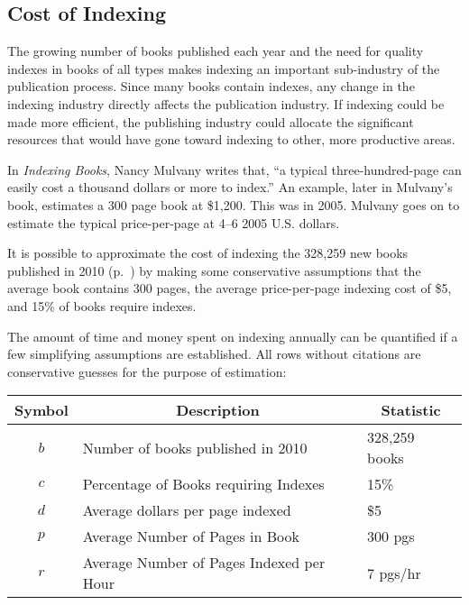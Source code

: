 \subsection{Cost of Indexing}

The growing number of books published each year and the need for quality indexes in books of all types makes indexing an important sub-industry of the publication process.
Since many books contain indexes, any change in the indexing industry directly affects the publication industry.
If indexing could be made more efficient, the publishing industry could allocate the significant resources that would have gone toward indexing to other, more productive areas.

In {\it Indexing Books}, Nancy Mulvany writes that, ``a typical three-hundred-page can easily cost a thousand dollars or more to index.''
An example, later in Mulvany's book, estimates a 300 page book at \$1,200.
This was in 2005.
Mulvany goes on to estimate the typical price-per-page at 4--6 2005 U.S. dollars\cite{mulvany}.

It is possible to approximate the cost of indexing the 328,259 new books published in 2010 (p.~\pageref{fig:new-books}) by making some conservative assumptions that the average book contains 300 pages, the average price-per-page indexing cost of \$5, and 15\% of books require indexes.

The amount of time and money spent on indexing annually can be quantified if a few simplifying assumptions are established.
All rows without citations are conservative guesses for the purpose of estimation:

\begin{center}
\begin{tabular}{|c|l|l|}
\hline
\multicolumn{1}{|c|}{{\bf Symbol}} & \multicolumn{1}{c|}{{\bf Description}} & \multicolumn{1}{c|}{{\bf Statistic}} \\
\hline
$b$ & Number of books published in 2010 \cite{bowker} & 328,259 books \\
\hline
$c$ & Percentage of Books requiring Indexes & 15\% \\
\hline
$d$ & Average dollars per page indexed \cite{mulvany} & \$5 \\
\hline 
$p$ & Average Number of Pages in Book & 300 pgs \\ 
\hline 
$r$ & Average Number of Pages Indexed per Hour \cite{connolly} & 7 pgs/hr \\
\hline
\end{tabular}
\end{center}

